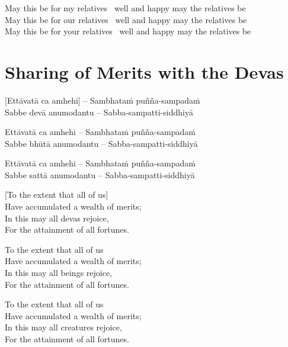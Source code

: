 \begin{english}
  May this be for my relatives \breathmark\ well and happy may the relatives be\\
  May this be for our relatives \breathmark\ well and happy may the relatives be\\
  May this be for your relatives \breathmark\ well and happy may the relatives be
\end{english}

\suttaRef{[Thai]}


\section{Sharing of Merits with the Devas}
\label{sharing-merits-devas}

[Ettāvatā ca amhehi] – Sambhataṁ puñña-sampadaṁ\\
Sabbe devā anumodantu – Sabba-sampatti-siddhiyā

Ettāvatā ca amhehi – Sambhataṁ puñña-sampadaṁ\\
Sabbe bhūtā anumodantu – Sabba-sampatti-siddhiyā

Ettāvatā ca amhehi – Sambhataṁ puñña-sampadaṁ\\
Sabbe sattā anumodantu – Sabba-sampatti-siddhiyā

\begin{english}
  [To the extent that all of us]\\
  Have accumulated a wealth of merits;\\
  In this may all devas rejoice,\\
  For the attainment of all fortunes.
\end{english}

\begin{english}
  To the extent that all of us\\
  Have accumulated a wealth of merits;\\
  In this may all beings rejoice,\\
  For the attainment of all fortunes.
\end{english}

\begin{english}
  To the extent that all of us\\
  Have accumulated a wealth of merits;\\
  In this may all creatures rejoice,\\
  For the attainment of all fortunes.
\end{english}

